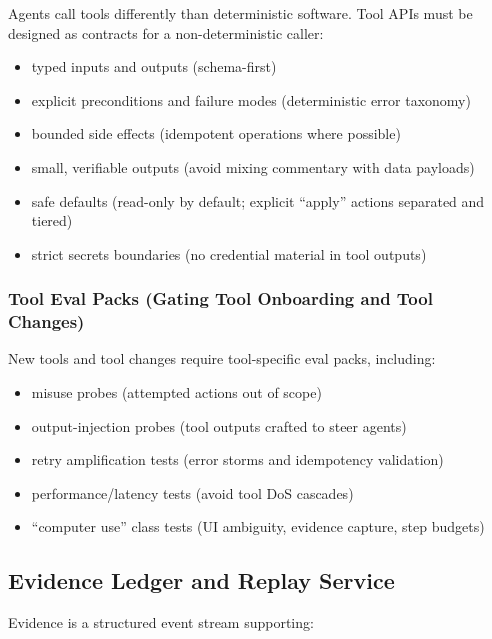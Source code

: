 \documentclass[11pt]{article}
\begin{document}
Agents call tools differently than deterministic software. Tool APIs
must be designed as contracts for a non-deterministic caller:

\begin{itemize}
\tightlist
\item
  typed inputs and outputs (schema-first)
\item
  explicit preconditions and failure modes (deterministic error
  taxonomy)
\item
  bounded side effects (idempotent operations where possible)
\item
  small, verifiable outputs (avoid mixing commentary with data payloads)
\item
  safe defaults (read-only by default; explicit ``apply'' actions
  separated and tiered)
\item
  strict secrets boundaries (no credential material in tool outputs)
\end{itemize}

\hypertarget{tool-eval-packs-gating-tool-onboarding-and-tool-changes}{%
\subsubsection{Tool Eval Packs (Gating Tool Onboarding and Tool Changes)}\label{tool-eval-packs-gating-tool-onboarding-and-tool-changes}}

New tools and tool changes require tool-specific eval packs, including:

\begin{itemize}
\tightlist
\item
  misuse probes (attempted actions out of scope)
\item
  output-injection probes (tool outputs crafted to steer agents)
\item
  retry amplification tests (error storms and idempotency validation)
\item
  performance/latency tests (avoid tool DoS cascades)
\item
  ``computer use'' class tests (UI ambiguity, evidence capture, step
  budgets)
\end{itemize}

\hypertarget{evidence-ledger-and-replay-service}{%
\subsection{Evidence Ledger and Replay Service}\label{evidence-ledger-and-replay-service}}

Evidence is a structured event stream supporting:
\end{document}
